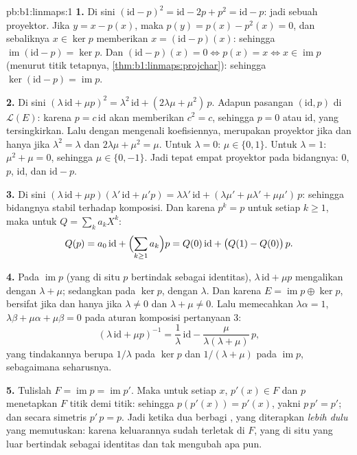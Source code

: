 \begin{solution}{pb:b1:linmaps:1}
\textbf{1.} Di sini $(\mathrm{id} - p)^2 = \mathrm{id} - 2p + p^2 =
\mathrm{id} - p$: jadi sebuah proyektor. Jika $y = x - p(x)$, maka $p(y) =
p(x) - p^2(x) = 0$, dan sebaliknya $x \in \ker p$ memberikan $x =
(\mathrm{id} - p)(x)$: sehingga $\operatorname{im}(\mathrm{id} - p) = \ker
p$. Dan $(\mathrm{id} - p)(x) = 0 \iff p(x) = x \iff x \in
\operatorname{im} p$ (menurut titik tetapnya,
\cref{thm:b1:linmaps:projchar}): sehingga $\ker(\mathrm{id} - p) =
\operatorname{im} p$.

\textbf{2.} Di sini $(\lambda\,\mathrm{id} + \mu p)^2 =
\lambda^2\,\mathrm{id} + (2\lambda\mu + \mu^2)\,p$. Adapun pasangan
$(\mathrm{id}, p)$  di $\mathcal{L}(E)$: karena $p = c\,
\mathrm{id}$ akan memberikan $c^2 = c$, sehingga $p = 0$ atau $\mathrm{id}$,
yang tersingkirkan. Lalu dengan mengenali koefisiennya,  merupakan proyektor jika dan hanya jika
$\lambda^2 = \lambda$ dan $2\lambda\mu + \mu^2 = \mu$. Untuk
$\lambda = 0$: $\mu \in \{0, 1\}$. Untuk $\lambda = 1$: $\mu^2 +
\mu = 0$, sehingga $\mu \in \{0, -1\}$. Jadi tepat empat proyektor pada
bidangnya: $0$, $p$, $\mathrm{id}$, dan $\mathrm{id} - p$.

\textbf{3.} Di sini $(\lambda\,\mathrm{id} + \mu p)(\lambda'\,\mathrm{id}
+ \mu' p) = \lambda\lambda'\,\mathrm{id} + (\lambda\mu' +
\mu\lambda' + \mu\mu')\,p$: sehingga bidangnya stabil terhadap
komposisi. Dan karena $p^k = p$ untuk setiap $k \geq 1$, maka untuk $Q =
\sum_k a_k X^k$:
\[
Q(p) = a_0\,\mathrm{id} + \Bigl(\sum_{k \geq 1} a_k\Bigr) p
= Q(0)\,\mathrm{id} + \bigl(Q(1) - Q(0)\bigr)\,p .
\]

\textbf{4.} Pada $\operatorname{im} p$ (yang di situ $p$ bertindak sebagai
identitas), $\lambda\,\mathrm{id} + \mu p$ mengalikan dengan $\lambda
+ \mu$; sedangkan pada $\ker p$, dengan $\lambda$. Dan karena $E = \operatorname{im} p
\oplus \ker p$,  bersifat  jika dan hanya jika $\lambda \neq 0$ dan
$\lambda + \mu \neq 0$. Lalu memecahkan $\lambda\alpha = 1$,
$\lambda\beta + \mu\alpha + \mu\beta = 0$ pada aturan komposisi
pertanyaan 3:
\[
(\lambda\,\mathrm{id} + \mu p)^{-1}
= \frac1\lambda\,\mathrm{id} -
\frac{\mu}{\lambda(\lambda + \mu)}\,p ,
\]
yang tindakannya berupa $1/\lambda$ pada $\ker p$ dan $1/(\lambda +
\mu)$ pada $\operatorname{im} p$, sebagaimana seharusnya.

\textbf{5.} Tulislah $F = \operatorname{im} p = \operatorname{im}
p'$. Maka untuk setiap $x$, $p'(x) \in F$ dan $p$ menetapkan $F$ titik demi titik:
sehingga $p(p'(x)) = p'(x)$, yakni $p\,p' = p'$; dan secara simetris $p'\,p =
p$. Jadi ketika dua  berbagi , yang diterapkan
\emph{lebih dulu} yang memutuskan: karena keluarannya sudah terletak di $F$, yang di situ
 yang luar bertindak sebagai identitas dan tak mengubah apa pun.


\end{solution}
